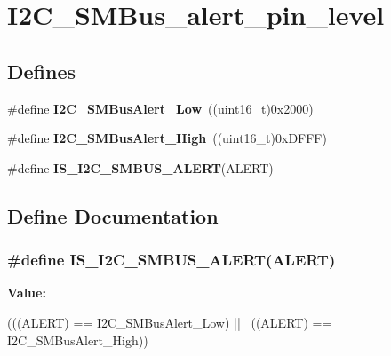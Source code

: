 \hypertarget{group__I2C__SMBus__alert__pin__level}{
\section{I2C\_\-SMBus\_\-alert\_\-pin\_\-level}
\label{group__I2C__SMBus__alert__pin__level}
}
\subsection*{Defines}
\begin{DoxyCompactItemize}
\item 
\hypertarget{group__I2C__SMBus__alert__pin__level_ga6f923166107afb8aad1d7d1a87048d6e}{
\#define {\bfseries I2C\_\-SMBusAlert\_\-Low}~((uint16\_\-t)0x2000)}
\label{group__I2C__SMBus__alert__pin__level_ga6f923166107afb8aad1d7d1a87048d6e}

\item 
\hypertarget{group__I2C__SMBus__alert__pin__level_gac3ab64f43ef90f0f83f9c88981aaa862}{
\#define {\bfseries I2C\_\-SMBusAlert\_\-High}~((uint16\_\-t)0xDFFF)}
\label{group__I2C__SMBus__alert__pin__level_gac3ab64f43ef90f0f83f9c88981aaa862}

\item 
\#define {\bfseries IS\_\-I2C\_\-SMBUS\_\-ALERT}(ALERT)
\end{DoxyCompactItemize}


\subsection{Define Documentation}
\hypertarget{group__I2C__SMBus__alert__pin__level_ga61b0c91563eb4bd598329241fe7d3bb4}{
\subsubsection[{IS\_\-I2C\_\-SMBUS\_\-ALERT}]{\setlength{\rightskip}{0pt plus 5cm}\#define IS\_\-I2C\_\-SMBUS\_\-ALERT(ALERT)}}
\label{group__I2C__SMBus__alert__pin__level_ga61b0c91563eb4bd598329241fe7d3bb4}
{\bfseries Value:}
\begin{DoxyCode}
(((ALERT) == I2C_SMBusAlert_Low) || \
                                   ((ALERT) == I2C_SMBusAlert_High))
\end{DoxyCode}

